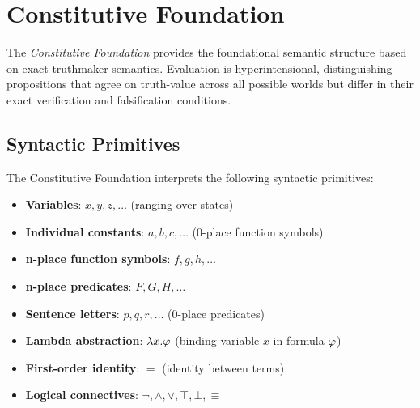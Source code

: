 \documentclass[../LogosReference.tex]{subfiles}
\begin{document}

\section{Constitutive Foundation}\label{sec:constitutive-foundation}

The \textit{Constitutive Foundation} provides the foundational semantic structure based on exact truthmaker semantics.
Evaluation is hyperintensional, distinguishing propositions that agree on truth-value across all possible worlds but differ in their exact verification and falsification conditions.


\subsection{Syntactic Primitives}\label{sec:syntactic-primitives}

The Constitutive Foundation interprets the following syntactic primitives:

\begin{itemize}
	\item \textbf{Variables}: $x, y, z, \ldots$ (ranging over states)
	\item \textbf{Individual constants}: $a, b, c, \ldots$ (0-place function symbols)
	\item \textbf{n-place function symbols}: $f, g, h, \ldots$
	\item \textbf{n-place predicates}: $F, G, H, \ldots$
	\item \textbf{Sentence letters}: $p, q, r, \ldots$ (0-place predicates)
	\item \textbf{Lambda abstraction}: $\lambda x.\varphi$ (binding variable $x$ in formula $\varphi$)
	\item \textbf{First-order identity}: $=$ (identity between terms)
	\item \textbf{Logical connectives}: $\neg, \land, \lor, \top, \bot, \equiv$
\end{itemize}

\end{document}
